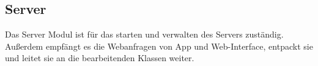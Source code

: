 \subsection{Server} \label{service:modul:Server}
Das Server Modul ist für das starten und verwalten des Servers zuständig. Außerdem empfängt es die Webanfragen von App und Web-Interface, entpackt sie und leitet sie an die bearbeitenden Klassen weiter.